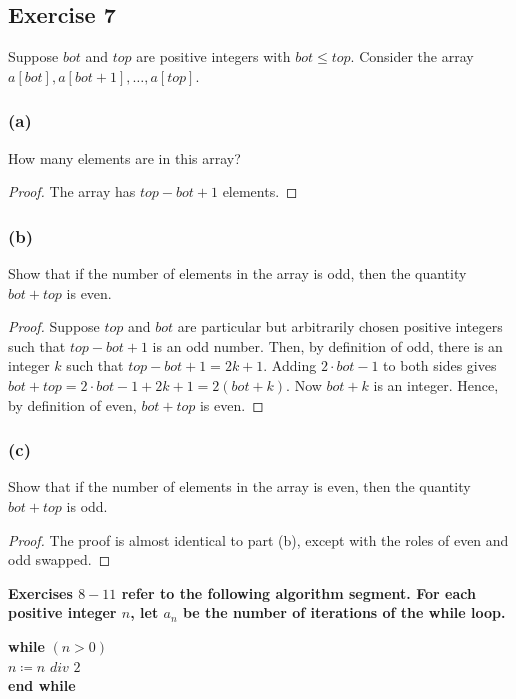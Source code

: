 \documentclass[14pt]{extarticle}
\newcommand{\cy}{\color{cyan}}
\begin{document}
\subsection{Exercise 7}
Suppose \(bot\) and \(top\) are positive integers with \(bot \leq top\). Consider the array 
\(a[bot], a[bot + 1], \ldots, a[top]\).

\subsubsection{(a)}
How many elements are in this array?
\begin{proof}
The array has \(top - bot + 1\) elements.
\end{proof}

\subsubsection{(b)}
Show that if the number of elements in the array is odd, then the quantity \(bot + top\) is even.

\begin{proof}
Suppose \(top\) and \(bot\) are particular but arbitrarily chosen positive integers such that \(top - bot + 1\) is an odd 
number. Then, by definition of odd, there is an integer \(k\) such that \(top - bot + 1 = 2k + 1\). Adding \(2\cdot bot-1\) 
to both sides gives \(bot + top = 2 \cdot bot - 1 + 2k + 1 = 2(bot + k).\) Now \(bot + k\) is an integer. Hence, by 
definition of even, \(bot + top\) is even.
\end{proof}

\subsubsection{(c)}
Show that if the number of elements in the array is even, then the quantity \(bot + top\) is odd.

\begin{proof}
The proof is almost identical to part (b), except with the roles of even and odd swapped.
\end{proof}

{\bf \cy Exercises \(8-11\) refer to the following algorithm segment. For each positive integer \(n\), let \(a_n\) be the 
number of iterations of the while loop.
\begin{center}
{\bf while} \((n > 0)\) \\
\hspace{2cm} \(n \coloneqq n \,\, div \,\, 2\) \\
{\bf end while}
\end{center}
}
\end{document}
